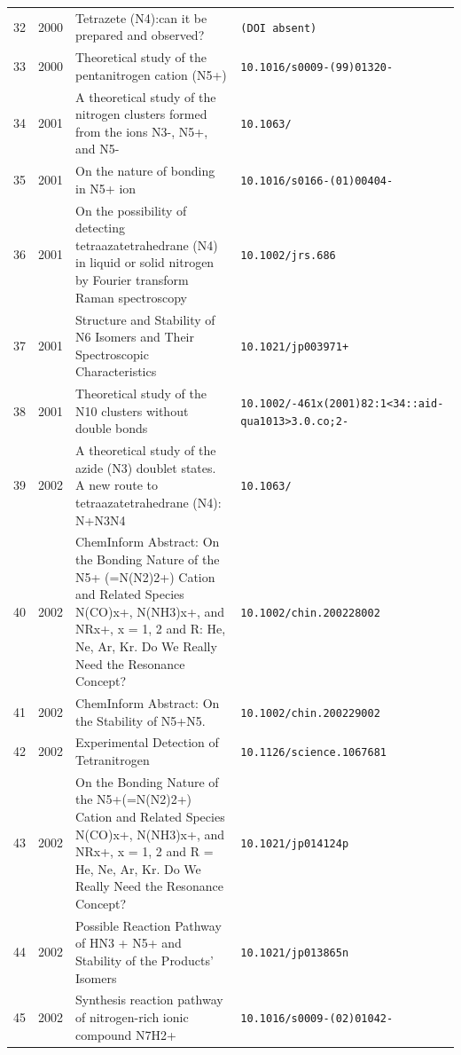 {\begin{longtable}{@{}cp{1.0cm}p{8.4cm}p{4.2cm}@{}}
32 & 2000 & Tetrazete (N4):can it be prepared and observed? & \texttt{(DOI absent)} \\
33 & 2000 & Theoretical study of the pentanitrogen cation (N5+) & \texttt{10.1016/\allowbreak s0009-\allowbreak 2614(99)01320-\allowbreak 2} \\
34 & 2001 & A theoretical study of the nitrogen clusters formed from the ions N3-, N5+, and N5- & \texttt{10.1063/\allowbreak 1.1370063} \\
35 & 2001 & On the nature of bonding in N5+ ion & \texttt{10.1016/\allowbreak s0166-\allowbreak 1280(01)00404-\allowbreak 3} \\
36 & 2001 & On the possibility of detecting tetraazatetrahedrane (N4) in liquid or solid nitrogen by Fourier transform Raman spectroscopy & \texttt{10.1002/\allowbreak jrs.686} \\
37 & 2001 & Structure and Stability of N6 Isomers and Their Spectroscopic Characteristics & \texttt{10.1021/\allowbreak jp003971+} \\
38 & 2001 & Theoretical study of the N10 clusters without double bonds & \texttt{10.1002/\allowbreak 1097-\allowbreak 461x(2001)82:1<34::aid-\allowbreak qua1013>3.0.co;2-\allowbreak 1} \\
39 & 2002 & A theoretical study of the azide (N3) doublet states. A new route to tetraazatetrahedrane (N4): N+N3N4 & \texttt{10.1063/\allowbreak 1.1476310} \\
40 & 2002 & ChemInform Abstract: On the Bonding Nature of the N5+ (=N(N2)2+) Cation and Related Species N(CO)x+, N(NH3)x+, and NRx+, x = 1, 2 and R: He, Ne, Ar, Kr. Do We Really Need the Resonance Concept? & \texttt{10.1002/\allowbreak chin.200228002} \\
41 & 2002 & ChemInform Abstract: On the Stability of N5+N5. & \texttt{10.1002/\allowbreak chin.200229002} \\
42 & 2002 & Experimental Detection of Tetranitrogen & \texttt{10.1126/\allowbreak science.1067681} \\
43 & 2002 & On the Bonding Nature of the N5+(=N(N2)2+) Cation and Related Species N(CO)x+, N(NH3)x+, and NRx+, x = 1, 2 and R = He, Ne, Ar, Kr. Do We Really Need the Resonance Concept? & \texttt{10.1021/\allowbreak jp014124p} \\
44 & 2002 & Possible Reaction Pathway of HN3 + N5+ and Stability of the Products' Isomers & \texttt{10.1021/\allowbreak jp013865n} \\
45 & 2002 & Synthesis reaction pathway of nitrogen-rich ionic compound N7H2+ & \texttt{10.1016/\allowbreak s0009-\allowbreak 2614(02)01042-\allowbreak 4} \\

\end{longtable}}
